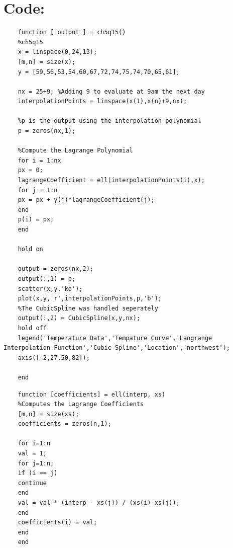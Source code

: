 \documentclass[11pt,a4paper]{article}
\begin{document}
	\section{Code:}
	\begin{lstlisting} 
	function [ output ] = ch5q15()
	%ch5q15
	x = linspace(0,24,13);
	[m,n] = size(x);
	y = [59,56,53,54,60,67,72,74,75,74,70,65,61];
	
	nx = 25+9; %Adding 9 to evaluate at 9am the next day
	interpolationPoints = linspace(x(1),x(n)+9,nx);
	
	%p is the output using the interpolation polynomial
	p = zeros(nx,1);
	
	%Compute the Lagrange Polynomial
	for i = 1:nx
	px = 0;
	lagrangeCoefficient = ell(interpolationPoints(i),x);
	for j = 1:n
	px = px + y(j)*lagrangeCoefficient(j);
	end
	p(i) = px;
	end
	
	hold on
	
	output = zeros(nx,2);
	output(:,1) = p;
	scatter(x,y,'ko');
	plot(x,y,'r',interpolationPoints,p,'b');
	%The CubicSpline was handled seperately
	output(:,2) = CubicSpline(x,y,nx);
	hold off
	legend('Temperature Data','Tempature Curve','Langrange Interpolation Function','Cubic Spline','Location','northwest');
	axis([-2,27,50,82]);
	
	end
	\end{lstlisting}
	
	\begin{lstlisting}
	function [coefficients] = ell(interp, xs)
	%Computes the Lagrange Coefficients
	[m,n] = size(xs);
	coefficients = zeros(n,1);
	
	for i=1:n
	val = 1;
	for j=1:n;
	if (i == j)
	continue
	end
	val = val * (interp - xs(j)) / (xs(i)-xs(j));
	end
	coefficients(i) = val;
	end
	end
	\end{lstlisting}
	
\end{document}
